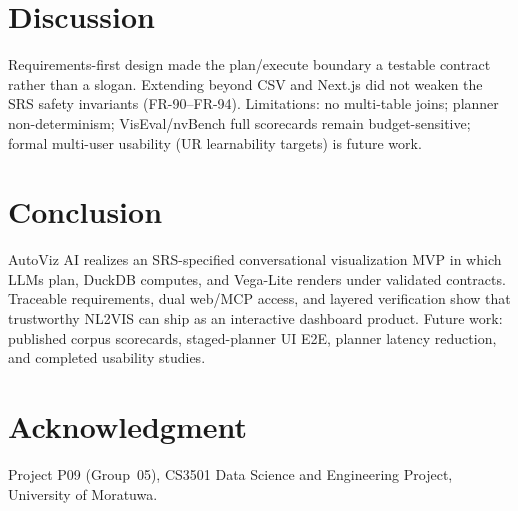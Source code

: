 \documentclass[conference]{IEEEtran}
\begin{document}
\section{Discussion}
Requirements-first design made the plan/execute boundary a testable contract rather than a slogan. Extending beyond CSV and Next.js did not weaken the SRS safety invariants (FR-90--FR-94). Limitations: no multi-table joins; planner non-determinism; VisEval/nvBench full scorecards remain budget-sensitive; formal multi-user usability (UR learnability targets) is future work.

\section{Conclusion}
AutoViz AI realizes an SRS-specified conversational visualization MVP in which LLMs plan, DuckDB computes, and Vega-Lite renders under validated contracts. Traceable requirements, dual web/MCP access, and layered verification show that trustworthy NL2VIS can ship as an interactive dashboard product. Future work: published corpus scorecards, staged-planner UI E2E, planner latency reduction, and completed usability studies.

\section*{Acknowledgment}
Project P09 (Group~05), CS3501 Data Science and Engineering Project, University of Moratuwa.
\end{document}
